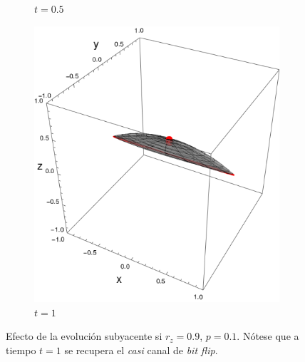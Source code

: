 \begin{figure}[ht!]
\begin{subfigure}{0.32\textwidth}
    \caption{$t=0.5$}
  \end{subfigure}
  \begin{subfigure}{0.32\textwidth}
    \centering
    \includegraphics[width=0.9\linewidth]{chapter3/figures_toy/sphere_CNOT_t=1._r=0.9_p=0.1.png}
    \caption{$t=1$}
  \end{subfigure}
  \caption{Efecto de la evolución subyacente si $r_{z}=0.9$, $p=0.1$. Nótese que a tiempo $t=1$ se recupera el \textit{casi} canal de \textit{bit flip}. }
  \label{fig:AlmostBitFlipSequence}
  \end{figure}

